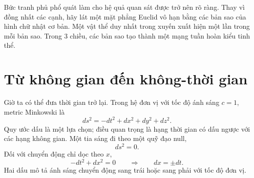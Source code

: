 Bức tranh phủ phổ quát làm cho hệ quả quan sát được trở nên rõ ràng. Thay vì đồng nhất các cạnh, hãy lát một mặt phẳng Euclid vô hạn bằng các bản sao của hình chữ nhật cơ bản. Một vật thể duy nhất trong xuyến xuất hiện một lần trong mỗi bản sao. Trong 3 chiều, các bản sao tạo thành một mạng tuần hoàn kiểu tinh thể.

\begin{classroomqa}
\end{classroomqa}

\begin{classroomqa}
\end{classroomqa}

\section{Từ không gian đến không-thời gian}

Giờ ta có thể đưa thời gian trở lại. Trong hệ đơn vị với tốc độ ánh sáng \(c=1\), metric Minkowski là
\begin{equation}
ds^2 = -dt^2 + dx^2 + dy^2 + dz^2.
\label{eq:c03-minkowski}
\end{equation}
Quy ước dấu là một lựa chọn; điều quan trọng là hạng thời gian có dấu ngược với các hạng không gian. Một tia sáng đi theo một quỹ đạo null,
\begin{equation}
ds^2 = 0.
\end{equation}
Đối với chuyển động chỉ dọc theo \(x\),
\begin{equation}
-dt^2 + dx^2 = 0
\qquad\Rightarrow\qquad
dx = \pm dt.
\label{eq:c03-null-flat}
\end{equation}
Hai dấu mô tả ánh sáng chuyển động sang trái hoặc sang phải với tốc độ đơn vị.

